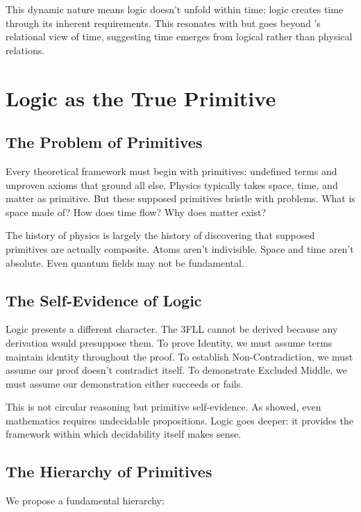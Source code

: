 \documentclass[12pt,a4paper]{article}
\begin{document}
This dynamic nature means logic doesn't unfold within time; logic creates time through its inherent requirements. This resonates with but goes beyond \citet{rovelli2018order}'s relational view of time, suggesting time emerges from logical rather than physical relations.

\section{Logic as the True Primitive}

\subsection{The Problem of Primitives}

Every theoretical framework must begin with primitives: undefined terms and unproven axioms that ground all else. Physics typically takes space, time, and matter as primitive. But these supposed primitives bristle with problems. What is space made of? How does time flow? Why does matter exist?

The history of physics is largely the history of discovering that supposed primitives are actually composite. Atoms aren't indivisible. Space and time aren't absolute. Even quantum fields may not be fundamental.

\subsection{The Self-Evidence of Logic}

Logic presents a different character. The 3FLL cannot be derived because any derivation would presuppose them. To prove Identity, we must assume terms maintain identity throughout the proof. To establish Non-Contradiction, we must assume our proof doesn't contradict itself. To demonstrate Excluded Middle, we must assume our demonstration either succeeds or fails.

This is not circular reasoning but primitive self-evidence. As \citet{godel1931formally} showed, even mathematics requires undecidable propositions. Logic goes deeper: it provides the framework within which decidability itself makes sense.

\subsection{The Hierarchy of Primitives}

We propose a fundamental hierarchy:
\end{document}
